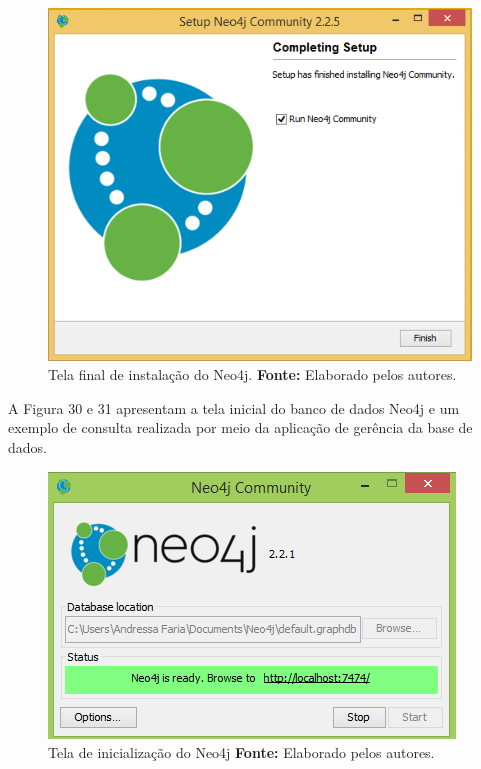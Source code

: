 \begin{figure}[h!]
	\centerline{\includegraphics[scale=0.4]{./imagens/neo4j-install-step5.png}}
	\caption[Tela final de instalação do Neo4j]
	{Tela final de instalação do Neo4j. \textbf{Fonte:} Elaborado pelos autores.}
	\label{fig:exemplo1}
	
\end{figure}

\par A Figura 30 e 31 apresentam a tela inicial do banco de dados Neo4j e um exemplo de consulta realizada por meio da aplicação de gerência da base de dados.

\begin{figure}[h!]
	\centerline{\includegraphics[scale=0.60]{./imagens/neo4j.jpg}}
	\caption[Tela de inicialização do Neo4j ]
	{Tela de inicialização do Neo4j \textbf{Fonte:} Elaborado pelos autores.}
	\label{fig:exemplo1}
\end{figure}


